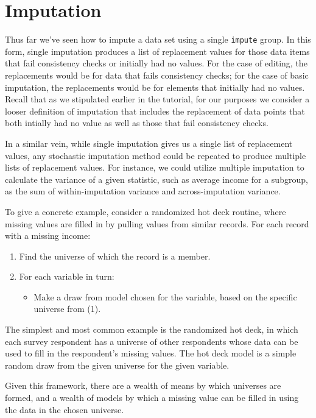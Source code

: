 \documentclass{article}
\def\tighten{ \setlength{\itemsep}{1pt}
    \setlength{\parskip}{0pt}}
\begin{document}
\section{Imputation}
Thus far we've seen how to impute a data set using a single {\tt impute} group. In this form, single 
imputation produces a list of replacement values for those data items that fail consistency checks 
or initially had no values. For the case of editing, the replacements would be for data that fails 
consistency checks; for the case of basic imputation, the replacements would be for elements that
initially had no values. Recall that as we stipulated earlier in the tutorial, for our purposes we 
consider a looser definition of imputation that includes the replacement of data points that both 
intially had no value as well as those that fail consistency checks.

In a similar vein, while single imputation gives us a single list of replacement values, any stochastic 
imputation method could be repeated to produce multiple lists of replacement values. For instance, 
we could utilize multiple imputation to calculate the variance of a given statistic, such as average 
income for a subgroup, as the sum of within-imputation variance and across-imputation variance.

To give a concrete example, consider a randomized hot deck routine, where missing values are
filled in by pulling values from similar records. For each record with a missing income:
\begin{enumerate}
\tighten
\item Find the universe of which the record is a member.
\item For each variable in turn:
    \begin{itemize}
    \item Make a draw from model chosen for the variable, based on the specific universe from (1).
    \end{itemize}
\end{enumerate}


The simplest and most common example is the randomized hot deck, in which each survey respondent 
has a universe of other respondents whose data can be used to fill in the respondent's missing
values. The hot deck model is a simple random draw from the given universe for the given variable.

Given this framework, there are a wealth of means by which universes are formed, and
a wealth of models by which a missing value can be filled in using the data in the chosen universe.
\end{document}
